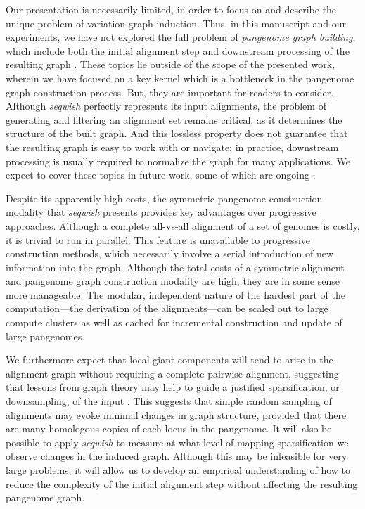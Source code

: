 \documentclass{bioinfo}
\theoremstyle{definition}
\begin{document}
Our presentation is necessarily limited, in order to focus on and describe the unique problem of variation graph induction.
Thus, in this manuscript and our experiments, we have not explored the full problem of \textit{pangenome graph building}, which include both the initial alignment step and downstream processing of the resulting graph \citep{Liao_2022}.
These topics lie outside of the scope of the presented work, wherein we have focused on a key kernel which is a bottleneck in the pangenome graph construction process.
But, they are important for readers to consider.
Although \textit{seqwish} perfectly represents its input alignments, the problem of generating and filtering an alignment set remains critical, as it determines the structure of the built graph.
And this lossless property does not guarantee that the resulting graph is easy to work with or navigate; in practice, downstream processing is usually required to normalize the graph for many applications.
We expect to cover these topics in future work, some of which are ongoing \citep{Liao_2022,Garrison2022_pggb}.

Despite its apparently high costs, the symmetric pangenome construction modality that \textit{seqwish} presents provides key advantages over progressive approaches.
Although a complete all-vs-all alignment of a set of genomes is costly, it is trivial to run in parallel.
This feature is unavailable to progressive construction methods, which necessarily involve a serial introduction of new information into the graph.
Although the total costs of a symmetric alignment and pangenome graph construction modality are high, they are in some sense more manageable.
The modular, independent nature of the hardest part of the computation---the derivation of the alignments---can be scaled out to large compute clusters as well as cached for incremental construction and update of large pangenomes.

We furthermore expect that local giant components will tend to arise in the alignment graph without requiring a complete pairwise alignment, suggesting that lessons from graph theory may help to guide a justified sparsification, or downsampling, of the input \citep{Janson1993-ac}.
This suggests that simple random sampling of alignments may evoke minimal changes in graph structure, provided that there are many homologous copies of each locus in the pangenome.
It will also be possible to apply \textit{seqwish} to measure at what level of mapping sparsification we observe changes in the induced graph.
Although this may be infeasible for very large problems, it will allow us to develop an empirical understanding of how to reduce the complexity of the initial alignment step without affecting the resulting pangenome graph.
\end{document}
